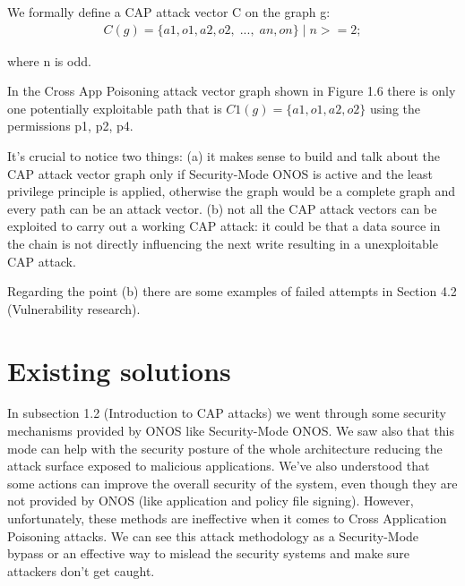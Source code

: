 \documentclass[a4paper,10pt]{memoir}
\begin{document}
We formally define a CAP attack vector C on the graph g:
\begin{align}
C(g) = \{a1,o1,a2,o2,\;...,\;an,on\} \;|\; n >= 2; 
\end{align}

where n is odd.

In the Cross App Poisoning attack vector graph shown in Figure 1.6 there is only one potentially exploitable path that is $C1(g) = \{a1, o1, a2, o2\}$ using the permissions p1, p2, p4. 

It's crucial to notice two things: (a) it makes sense to build and talk about the CAP attack vector graph only if Security-Mode ONOS is active and the least privilege principle is applied, otherwise the graph would be a complete graph and every path can be an attack vector. (b) not all the CAP attack vectors can be exploited to carry out a working CAP attack: it could be that a data source in the chain is not directly influencing the next write resulting in a unexploitable CAP attack.

Regarding the point (b) there are some examples of failed attempts in Section 4.2 (Vulnerability research). 

\clearpage

\section{Existing solutions}
In subsection 1.2 (Introduction to CAP attacks) we went through some security mechanisms provided by ONOS like Security-Mode ONOS. We saw also that this mode can help with the security posture of the whole architecture reducing the attack surface exposed to malicious applications. We've also understood that some actions can improve the overall security of the system, even though they are not provided by ONOS (like application and policy file signing). However, unfortunately, these methods are ineffective when it comes to Cross Application Poisoning attacks. We can see this attack methodology as a Security-Mode bypass or an effective way to mislead the security systems and make sure attackers don't get caught.
\end{document}
